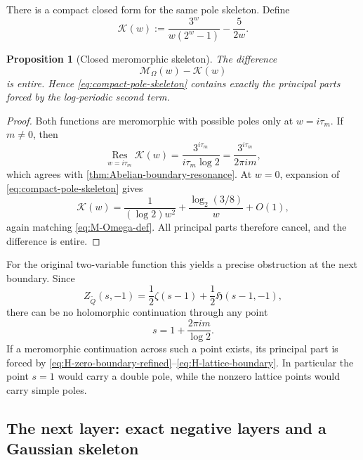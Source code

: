 \documentclass[11pt]{article}
\newtheorem{proposition}[theorem]{Proposition}
\theoremstyle{definition}
\theoremstyle{remark}
\newcommand{\Qp}{\widetilde Q}
\newcommand{\Hz}{\mathfrak H}
\begin{document}
There is a compact closed form for the same pole skeleton.  Define
\begin{equation}
\boxed{
\mathcal K(w)
:=\frac{3^w}{w(2^w-1)}-\frac{5}{2w}.
}
\label{eq:compact-pole-skeleton}
\end{equation}

\begin{proposition}[Closed meromorphic skeleton]
\label{prop:closed-pole-skeleton}
The difference
\begin{equation}
\mathcal M_{\Omega}(w)-\mathcal K(w)
\label{eq:M-minus-K}
\end{equation}
is entire.  Hence \eqref{eq:compact-pole-skeleton} contains exactly the
principal parts forced by the log-periodic second term.
\end{proposition}

\begin{proof}
Both functions are meromorphic with possible poles only at
$w=i\tau_m$.  If $m\ne0$, then
\[
\operatorname*{Res}_{w=i\tau_m}\mathcal K(w)
=\frac{3^{i\tau_m}}{i\tau_m\log2}
=\frac{3^{i\tau_m}}{2\pi i m},
\]
which agrees with \cref{thm:Abelian-boundary-resonance}.  At $w=0$,
expansion of \eqref{eq:compact-pole-skeleton} gives
\[
\mathcal K(w)
=\frac1{(\log2)w^2}
+\frac{\log_2(3/8)}{w}
+O(1),
\]
again matching \eqref{eq:M-Omega-def}.  All principal parts therefore cancel,
and the difference is entire.
\end{proof}

For the original two-variable function this yields a precise obstruction at
the next boundary.  Since
\[
Z_{\Qp}(s,-1)
=\frac12\zeta(s-1)+\frac12\Hz(s-1,-1),
\]
there can be no holomorphic continuation through any point
\begin{equation}
s=1+\frac{2\pi i m}{\log2}.
\label{eq:s-boundary-lattice}
\end{equation}
If a meromorphic continuation across such a point exists, its principal part
is forced by \eqref{eq:H-zero-boundary-refined}--\eqref{eq:H-lattice-boundary}.
In particular the point $s=1$ would carry a double pole, while the nonzero
lattice points would carry simple poles.

\subsection{The next layer: exact negative layers and a Gaussian skeleton}
\end{document}
